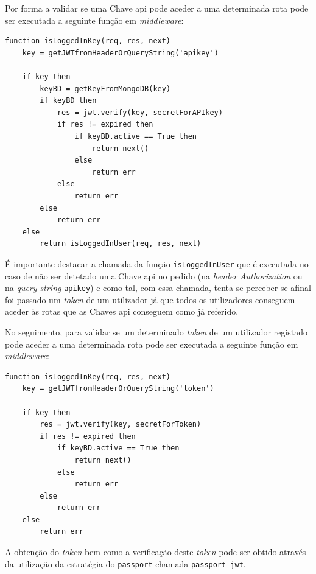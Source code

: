 Por forma a validar se uma Chave \acrshort{api} pode aceder a uma determinada rota pode ser executada a seguinte função em \textit{middleware}:
\begin{lstlisting}[language=pseudocode, caption=Verificação se um pedido com uma determinada Chave \acrshort{api} pode ser efetuado]
function isLoggedInKey(req, res, next)
    key = getJWTfromHeaderOrQueryString('apikey')

    if key then
        keyBD = getKeyFromMongoDB(key)
        if keyBD then
            res = jwt.verify(key, secretForAPIkey)
            if res != expired then
                if keyBD.active == True then
                    return next()
                else
                    return err
            else
                return err
        else
            return err
    else
        return isLoggedInUser(req, res, next)
\end{lstlisting}
É importante destacar a chamada da função \texttt{isLoggedInUser} que é executada no caso de não ser detetado uma Chave \acrshort{api} no pedido (na \textit{header} \textit{Authorization} ou na \textit{query string} \texttt{apikey}) e como tal, com essa chamada, tenta-se perceber se afinal foi passado um \textit{token} de um utilizador já que todos os utilizadores conseguem aceder às rotas que as Chaves \acrshort{api} conseguem como já referido.

No seguimento, para validar se um determinado \textit{token} de um utilizador registado pode aceder a uma determinada rota pode ser executada a seguinte função em \textit{middleware}:
\begin{lstlisting}[language=pseudocode, caption=Verificação se um pedido com um determinado \textit{token} de um utilizador registado pode ser efetuado]
function isLoggedInKey(req, res, next)
    key = getJWTfromHeaderOrQueryString('token')

    if key then
        res = jwt.verify(key, secretForToken)
        if res != expired then
            if keyBD.active == True then
                return next()
            else
                return err
        else
            return err
    else
        return err
\end{lstlisting}

A obtenção do \textit{token} bem como a verificação deste \textit{token} pode ser obtido através da utilização da estratégia do \texttt{passport} chamada \texttt{passport-jwt}.


